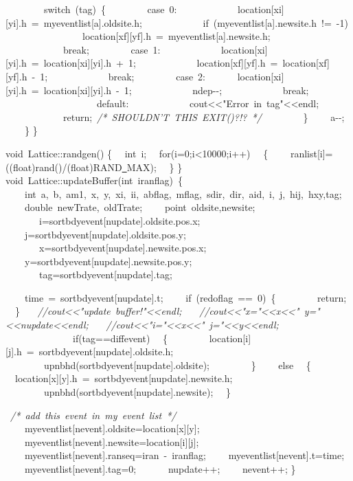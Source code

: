 {\ \ \ \ \ \ \ \ switch\ (tag)\ \{
\ \ \ \ \ \ \ \ case\ 0:
\ \ \ \ \ \ \ \ \ \ \ \ location[xi][yi].h\ =\ myeventlist[a].oldsite.h;
\ \ \ \ \ \ \ \ \ \ \ \ if\ (myeventlist[a].newsite.h\ !=\ -{}1)
\ \ \ \ \ \ \ \ \ \ \ \ \ \ \ \ location[xf][yf].h\ =\ myeventlist[a].newsite.h;
\ \ \ \ \ \ \ \ \ \ \ \ break;
\ \ \ \ \ \ \ \ case\ 1:
\ \ \ \ \ \ \ \ \ \ \ \ location[xi][yi].h\ =\ location[xi][yi].h\ +\ 1;
\ \ \ \ \ \ \ \ \ \ \ \ location[xf][yf].h\ =\ location[xf][yf].h\ -{}\ 1;
\ \ \ \ \ \ \ \ \ \ \ \ break;
\ \ \ \ \ \ \ \ case\ 2:
\ \ \ \ \ \ location[xi][yi].h\ =\ location[xi][yi].h\ -{}\ 1;
\ \ \ \ \ \ \ \ \ \ \ \ ndep-{}-{};
\ \ \ \ \ \ \ \ \ \ \ \ break;
\ \ \ \ \ \ \ \ \ \ \
\ \ \ \ \ \ \ \ default:
\ \ \ \ \ \ \ \ \ \ \ \ cout<{}<{}"{}Error\ in\ tag"{}<{}<{}endl;
\ \ \ \ \ \ \ \ \ \ \ \ return;\ \textsl{/*\ SHOULDN'T\ THIS\ EXIT()?!?\ */}
\ \ \ \ \ \ \ \ \}
\ \ \ \ a-{}-{};
\ \ \ \ \}
\}

void\ Lattice::randgen()
\{
\ \ int\ i;
\ \ for(i=0;i<{}10000;i++)
\ \ \{
\ \ \ \ ranlist[i]=((float)rand()/(float)RAND\underline\ MAX);
\ \ \}
\}
void\ Lattice::updateBuffer(int\ iranflag)\ \{
\ \ \ \ int\ a,\ b,\ am1,\ x,\ y,\ xi,\ ii,\ abflag,\ mflag,\ sdir,\ dir,\ aid,\ i,\ j,\ hij,\ hxy,tag;
\ \ \ \ double\ newTrate,\ oldTrate;
\ \ \ \ point\ oldsite,newsite;
\ \ \
\ \ \ \ i=sortbdyevent[nupdate].oldsite.pos.x;
\ \ \ \ j=sortbdyevent[nupdate].oldsite.pos.y;
\ \ \
\ \ \ \ x=sortbdyevent[nupdate].newsite.pos.x;
\ \ \ \ y=sortbdyevent[nupdate].newsite.pos.y;
\ \ \
\ \ \ \ tag=sortbdyevent[nupdate].tag;

\ \ \ \ time\ =\ sortbdyevent[nupdate].t;
\ \
\ \ if\ (redoflag\ ==\ 0)\ \{
\ \ \ \ \ \ \ \ return;
\ \ \}
\ \ \ \textsl{//cout<{}<{}"{}update\ buffer!"{}<{}<{}endl;}
\ \ \ \textsl{//cout<{}<{}"{}x="{}<{}<{}x<{}<{}"{}\ y="{}<{}<{}nupdate<{}<{}endl;}
\ \ \ \textsl{//cout<{}<{}"{}i="{}<{}<{}x<{}<{}"{}\ j="{}<{}<{}y<{}<{}endl;}
\ \ \
\ \ \ \
\ \ \
\ \ \ \ if(tag==diffevent)
\ \ \{
\ \ \ \ \ \ \ \ location[i][j].h\ =\ sortbdyevent[nupdate].oldsite.h;
\ \ \ \ \ \ \ \ upnbhd(sortbdyevent[nupdate].oldsite);
\ \ \ \ \ \ \ \ \}
\ \ \ \ else
\ \ \{
\ \ location[x][y].h\ =\ sortbdyevent[nupdate].newsite.h;
\ \ \ \ \ \ \ \ upnbhd(sortbdyevent[nupdate].newsite);
\ \ \}\ \

\ \textsl{/*\ add\ this\ event\ in\ my\ event\ list\ */}
\ \ \ \ myeventlist[nevent].oldsite=location[x][y];
\ \ \ \ myeventlist[nevent].newsite=location[i][j];
\ \ \ \ myeventlist[nevent].ranseq=iran\ -{}\ iranflag;
\ \ \ \ myeventlist[nevent].t=time;
\ \ \ \ myeventlist[nevent].tag=0;
\ \
\ \ \ \ nupdate++;
\ \ \ \ nevent++;
\}

}
